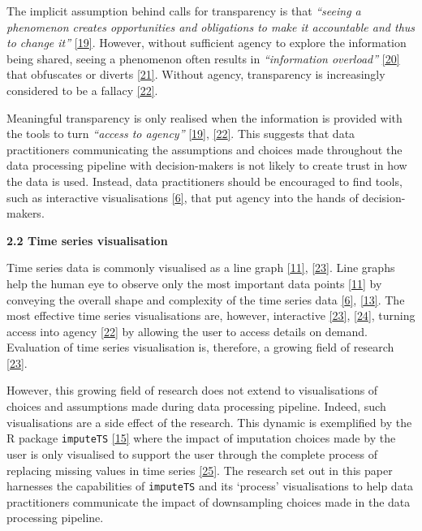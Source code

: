 \documentclass{article}
\begin{document}
The implicit assumption behind calls for transparency is that
\emph{``seeing a phenomenon creates opportunities and obligations to
make it accountable and thus to change it''}
\protect\hyperlink{ref-transparency_lack}{{[}19{]}}. However, without
sufficient agency to explore the information being shared, seeing a
phenomenon often results in \emph{``information overload''}
\protect\hyperlink{ref-digital_transparency}{{[}20{]}} that obfuscates
or diverts \protect\hyperlink{ref-transparency_obfuscation}{{[}21{]}}.
Without agency, transparency is increasingly considered to be a fallacy
\protect\hyperlink{ref-transparency_fallacy}{{[}22{]}}.

Meaningful transparency is only realised when the information is
provided with the tools to turn \emph{``access to agency''}
\protect\hyperlink{ref-transparency_lack}{{[}19{]}},
\protect\hyperlink{ref-transparency_fallacy}{{[}22{]}}. This suggests
that data practitioners communicating the assumptions and choices made
throughout the data processing pipeline with decision-makers is not
likely to create trust in how the data is used. Instead, data
practitioners should be encouraged to find tools, such as interactive
visualisations \protect\hyperlink{ref-datapoint}{{[}6{]}}, that put
agency into the hands of decision-makers.

\textbf{2.2 Time series visualisation}

Time series data is commonly visualised as a line graph
\protect\hyperlink{ref-Sveinn}{{[}11{]}},
\protect\hyperlink{ref-timenotes}{{[}23{]}}. Line graphs help the human
eye to observe only the most important data points
\protect\hyperlink{ref-Sveinn}{{[}11{]}} by conveying the overall shape
and complexity of the time series data
\protect\hyperlink{ref-datapoint}{{[}6{]}},
\protect\hyperlink{ref-downsampling}{{[}13{]}}. The most effective time
series visualisations are, however, interactive
\protect\hyperlink{ref-timenotes}{{[}23{]}},
\protect\hyperlink{ref-plotly}{{[}24{]}}, turning access into agency
\protect\hyperlink{ref-transparency_fallacy}{{[}22{]}} by allowing the
user to access details on demand. Evaluation of time series
visualisation is, therefore, a growing field of research
\protect\hyperlink{ref-timenotes}{{[}23{]}}.

However, this growing field of research does not extend to
visualisations of choices and assumptions made during data processing
pipeline. Indeed, such visualisations are a side effect of the research.
This dynamic is exemplified by the R package \texttt{imputeTS}
\protect\hyperlink{ref-imputeTS_R}{{[}15{]}} where the impact of
imputation choices made by the user is only visualised to support the
user through the complete process of replacing missing values in time
series \protect\hyperlink{ref-imputeTS}{{[}25{]}}. The research set out
in this paper harnesses the capabilities of \texttt{imputeTS} and its
`process' visualisations to help data practitioners communicate the
impact of downsampling choices made in the data processing pipeline.
\end{document}
